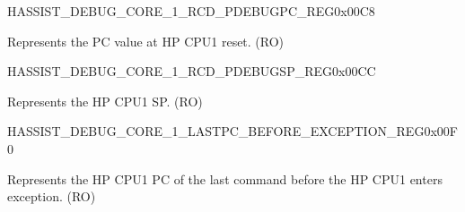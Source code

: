 \begin{register}{H}{ASSIST\_DEBUG\_CORE\_1\_RCD\_PDEBUGPC\_REG}{0x00C8}\label{regdesc:ASSISTDEBUGCORE1RCDPDEBUGPCREG}
%
\regnewline%
\begin{regdesc}\begin{reglist}
\label{fielddesc:ASSISTDEBUGCORE1RCDPDEBUGPC}\item [ASSIST\_DEBUG\_CORE\_1\_RCD\_PDEBUGPC] Represents the PC value at HP CPU1 reset. (RO)
\end{reglist}\end{regdesc}
\end{register}


\begin{register}{H}{ASSIST\_DEBUG\_CORE\_1\_RCD\_PDEBUGSP\_REG}{0x00CC}\label{regdesc:ASSISTDEBUGCORE1RCDPDEBUGSPREG}
%
\regnewline%
\begin{regdesc}\begin{reglist}
\label{fielddesc:ASSISTDEBUGCORE1RCDPDEBUGSP}\item [ASSIST\_DEBUG\_CORE\_1\_RCD\_PDEBUGSP] Represents the HP CPU1 SP. (RO)
\end{reglist}\end{regdesc}
\end{register}


\begin{register}{H}{ASSIST\_DEBUG\_CORE\_1\_LASTPC\_BEFORE\_EXCEPTION\_REG}{0x00F0}\label{regdesc:ASSISTDEBUGCORE1LASTPCBEFOREEXCEPTIONREG}
%
\regnewline%
\begin{regdesc}\begin{reglist}
\label{fielddesc:ASSISTDEBUGCORE1LASTPCBEFOREEXC}\item [ASSIST\_DEBUG\_CORE\_1\_LASTPC\_BEFORE\_EXC] Represents the HP CPU1 PC of the last command before the HP CPU1 enters exception. (RO)
\end{reglist}\end{regdesc}
\end{register}


